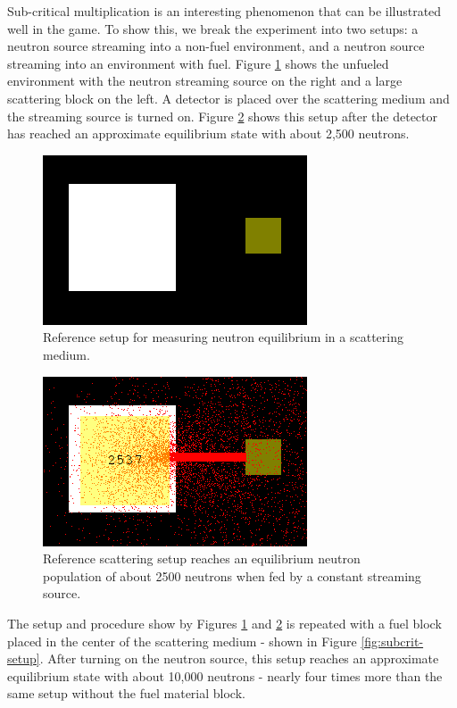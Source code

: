 \documentclass{anstrans}
\begin{document}
Sub-critical multiplication is an interesting phenomenon that can be
illustrated well in the game.  To show this, we break the experiment into two
setups: a neutron source streaming into a non-fuel environment, and a neutron
source streaming into an environment with fuel.  Figure
\ref{fig:scatter-setup} shows the unfueled environment with the neutron
streaming source on the right and a large scattering block on the left.  A
detector is placed over the scattering medium and the streaming source is
turned on. Figure \ref{fig:scatter-equil} shows this setup after the detector
has reached an approximate equilibrium state with about 2,500 neutrons.

\begin{figure}
    \centering
    \includegraphics{scatter-setup.png}
    \caption{Reference setup for measuring neutron equilibrium in a scattering medium.}
    \label{fig:scatter-setup}
\end{figure}

\begin{figure}
    \centering
    \includegraphics{scatter-equil.png}
    \caption{Reference scattering setup reaches an equilibrium neutron population of about 2500 neutrons when fed by a constant streaming source.}
    \label{fig:scatter-equil}
\end{figure}

The setup and procedure show by Figures \ref{fig:scatter-setup} and
\ref{fig:scatter-equil} is repeated with a fuel block placed in the center of
the scattering medium - shown in Figure \ref{fig:subcrit-setup}.  After
turning on the neutron source, this setup reaches an approximate equilibrium
state with about 10,000 neutrons - nearly four times more than the same setup
without the fuel material block.
\end{document}
